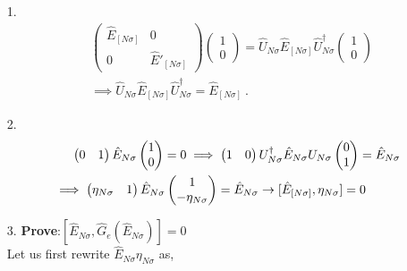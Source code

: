 \documentclass[12pt,a4paper]{article}
\begin{document}
\begin{itemize}
\item[1.]\begin{eqnarray}
&&\begin{pmatrix}
			\hat{E}_{[N\sigma]}							 & 0\\
				0					& \hat{E}'_{[N\sigma]}
											\end{pmatrix}\begin{pmatrix}
											1 \\ 0
											\end{pmatrix}=\hat{U}_{N\sigma}\hat{E}_{[N\sigma]}\hat{U}^{\dagger}_{N\sigma}\begin{pmatrix}
											1 \\ 0
											\end{pmatrix} \nonumber\\
											&&\implies  \hat{U}_{N\sigma}\hat{E}_{[N\sigma]}\hat{U}^{\dagger}_{N\sigma}=\hat{E}_{[N\sigma]}~.\label{corollary_Unitary}
\end{eqnarray}
\item[2.]\begin{eqnarray}
&& \begin{pmatrix}0 & 1\end{pmatrix} \hat{E}_{N\sigma} \begin{pmatrix}
1  \\ 0
\end{pmatrix}  = 0 \implies \begin{pmatrix}
 1 & 0
\end{pmatrix}U^{\dagger}_{N\sigma}\hat{E}_{N\sigma}U_{N\sigma} \begin{pmatrix}
 0 \\ 1
\end{pmatrix} =\hat{E}_{N\sigma}\nonumber\\
&&\implies \begin{pmatrix} \eta_{N\sigma} & 1\end{pmatrix}\hat{E}_{N\sigma}\begin{pmatrix}
1 \\ -\eta_{N\sigma}
\end{pmatrix} =\hat{E}_{N\sigma} \to [\hat{E}_{[N\sigma]},\eta_{N\sigma}]=0\hspace*{0.5cm}~~~~\label{commutation_block_ham_transition_op}
\end{eqnarray}
\item[3.] \textbf{Prove}:$[\hat{E}_{N\sigma},\hat{G}_{e}(\hat{E}_{N\sigma})] = 0$\\
Let us first rewrite $\hat{E}_{N\sigma}\eta_{N\sigma}$ as,

\end{itemize}
\end{document}
